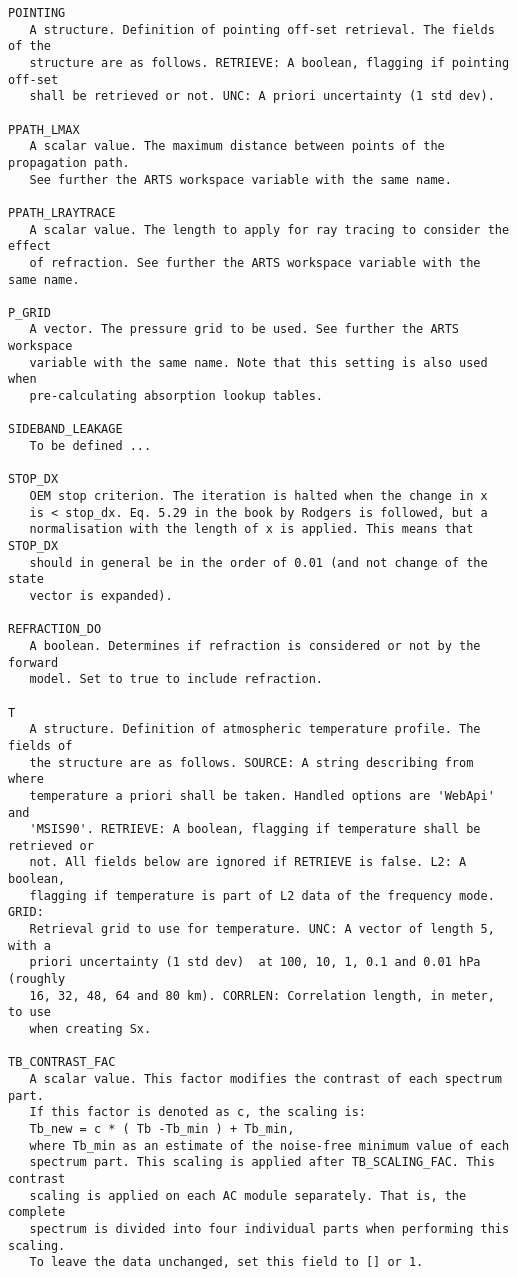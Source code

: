 \begin{verbatim}
POINTING
   A structure. Definition of pointing off-set retrieval. The fields of the
   structure are as follows. RETRIEVE: A boolean, flagging if pointing off-set
   shall be retrieved or not. UNC: A priori uncertainty (1 std dev).

PPATH_LMAX
   A scalar value. The maximum distance between points of the propagation path.
   See further the ARTS workspace variable with the same name.

PPATH_LRAYTRACE 
   A scalar value. The length to apply for ray tracing to consider the effect
   of refraction. See further the ARTS workspace variable with the same name.

P_GRID
   A vector. The pressure grid to be used. See further the ARTS workspace
   variable with the same name. Note that this setting is also used when
   pre-calculating absorption lookup tables.

SIDEBAND_LEAKAGE
   To be defined ...

STOP_DX
   OEM stop criterion. The iteration is halted when the change in x 
   is < stop_dx. Eq. 5.29 in the book by Rodgers is followed, but a
   normalisation with the length of x is applied. This means that STOP_DX
   should in general be in the order of 0.01 (and not change of the state
   vector is expanded).

REFRACTION_DO
   A boolean. Determines if refraction is considered or not by the forward
   model. Set to true to include refraction.

T
   A structure. Definition of atmospheric temperature profile. The fields of
   the structure are as follows. SOURCE: A string describing from where
   temperature a priori shall be taken. Handled options are 'WebApi' and
   'MSIS90'. RETRIEVE: A boolean, flagging if temperature shall be retrieved or
   not. All fields below are ignored if RETRIEVE is false. L2: A boolean,
   flagging if temperature is part of L2 data of the frequency mode. GRID:
   Retrieval grid to use for temperature. UNC: A vector of length 5, with a 
   priori uncertainty (1 std dev)  at 100, 10, 1, 0.1 and 0.01 hPa (roughly 
   16, 32, 48, 64 and 80 km). CORRLEN: Correlation length, in meter, to use 
   when creating Sx.

TB_CONTRAST_FAC
   A scalar value. This factor modifies the contrast of each spectrum part. 
   If this factor is denoted as c, the scaling is:
   Tb_new = c * ( Tb -Tb_min ) + Tb_min,
   where Tb_min as an estimate of the noise-free minimum value of each
   spectrum part. This scaling is applied after TB_SCALING_FAC. This contrast
   scaling is applied on each AC module separately. That is, the complete
   spectrum is divided into four individual parts when performing this scaling. 
   To leave the data unchanged, set this field to [] or 1. 


\end{verbatim}
